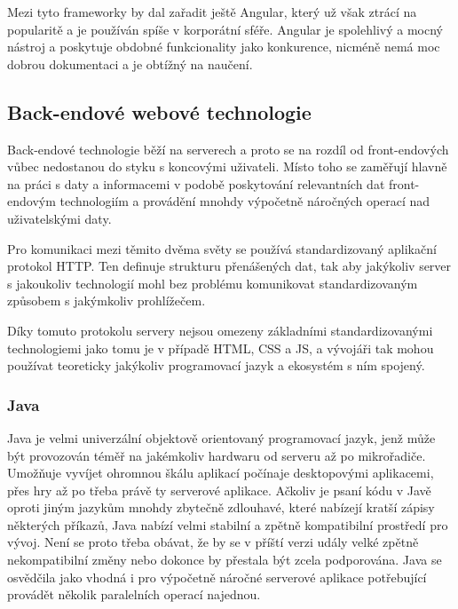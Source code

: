 		Mezi tyto frameworky by dal zařadit ještě Angular, který už však ztrácí na popularitě a je používán spíše v
		korporátní sféře.
		Angular je spolehlivý a mocný nástroj a poskytuje obdobné funkcionality jako konkurence,
		nicméně nemá moc dobrou dokumentaci a je obtížný na naučení. \cite{react_vs_angular}

	\subsection{Back-endové webové technologie}

	Back-endové technologie běží na serverech a proto se na rozdíl od front-endových vůbec nedostanou do styku s koncovými uživateli.
	Místo toho se zaměřují hlavně na práci s daty a informacemi v podobě poskytování relevantních dat front-endovým
	technologiím a provádění mnohdy výpočetně náročných operací nad uživatelskými daty.

	Pro komunikaci mezi těmito dvěma světy se používá standardizovaný aplikační protokol \noindent\Ac{HTTP}.
	Ten definuje strukturu přenášených dat, tak aby jakýkoliv server s jakoukoliv technologií mohl bez problému komunikovat
	standardizovaným způsobem s jakýmkoliv prohlížečem. \cite{http}

	Díky tomuto protokolu servery nejsou omezeny základními standardizovanými technologiemi jako tomu je v případě
	\Ac{HTML}, \Ac{CSS} a \ac{JS}, a vývojáři tak mohou používat teoreticky jakýkoliv programovací jazyk a ekosystém s ním
	spojený.

		\subsubsection{Java}

		Java je velmi univerzální objektově orientovaný programovací jazyk, jenž může být provozován téměř na jakémkoliv
		hardwaru od serveru až po mikrořadiče.
		Umožňuje vyvíjet ohromnou škálu aplikací počínaje desktopovými aplikacemi, přes hry až po třeba právě ty
		serverové aplikace. \cite{java}
		Ačkoliv je psaní kódu v Javě oproti jiným jazykům mnohdy zbytečně zdlouhavé, které nabízejí kratší zápisy
		některých příkazů, Java nabízí velmi stabilní a zpětně kompatibilní prostředí pro vývoj.
		Není se proto třeba obávat, že by se v příští verzi udály velké zpětně nekompatibilní změny nebo dokonce
		by přestala být zcela podporována.
		Java se osvědčila jako vhodná i pro výpočetně náročné serverové aplikace potřebující provádět několik paralelních
		operací najednou.

